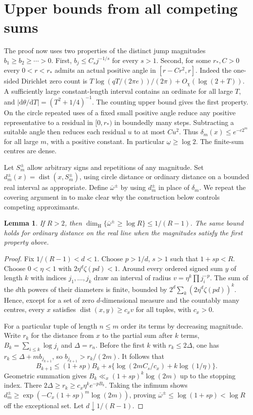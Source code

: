 \documentclass[11pt]{article}
\newtheorem{lemma}[theorem]{Lemma}
\newcommand{\HH}{\dim_{\mathrm H}}
\newcommand{\dist}{\operatorname{dist}}
\newcommand{\upexp}{\overline\omega}
\newcommand{\lowexp}{\underline\omega}
\begin{document}
\section{Upper bounds from all competing sums}
The proof now uses two properties of the distinct jump magnitudes $b_1\ge b_2\ge\cdots>0$. First, $b_j\le C_sj^{-1/s}$ for every $s>1$. Second, for some $r_*,C>0$ every $0<r<r_*$ admits an actual positive angle in $[r-Cr^2,r]$. Indeed the one-sided Dirichlet zero count is $T\log(qT/(2\pi e))/(2\pi)+O_\chi(\log(2+T))$. A sufficiently large constant-length interval contains an ordinate for all large $T$, and $|\mathrm d\theta/\mathrm dT|=(T^2+1/4)^{-1}$. The counting upper bound gives the first property. On the circle repeated uses of a fixed small positive angle reduce any positive representative to a residual in $[0,r_*)$ in boundedly many steps. Subtracting a suitable angle then reduces each residual $u$ to at most $Cu^2$. Thus $\delta_m(x)\le e^{-c2^m}$ for all large $m$, with a positive constant. In particular $\lowexp\ge\log2$. The finite-sum centres are dense.

Let $S_m^\pm$ allow arbitrary signs and repetitions of any magnitude. Set $d_m^\pm(x)=\dist(x,S_m^\pm)$, using circle distance or ordinary distance on a bounded real interval as appropriate. Define $\upexp^\pm$ by using $d_m^\pm$ in place of $\delta_m$. We repeat the covering argument in \cite{repoLi} to make clear why the construction below controls competing approximants.
\begin{lemma}\label{lem:cover}
If $R>2$, then $\HH\{\upexp^\pm\ge\log R\}\le 1/(R-1)$. The same bound holds for ordinary distance on the real line when the magnitudes satisfy the first property above.
\end{lemma}
\begin{proof}
Fix $1/(R-1)<d<1$. Choose $p>1/d$, $s>1$ such that $1+sp<R$. Choose $0<\eta<1$ with $2\eta^d\zeta(pd)<1$. Around every ordered signed sum $y$ of length $k$ with indices $j_1,\ldots,j_k$ draw an interval of radius $v=\eta^k\prod j_i^{-p}$. The sum of the $d$th powers of their diameters is finite, bounded by $2^d\sum_k(2\eta^d\zeta(pd))^k$. Hence, except for a set of zero $d$-dimensional measure and the countably many centres, every $x$ satisfies $\dist(x,y)\ge c_x v$ for all tuples, with $c_x>0$.

For a particular tuple of length $n\le m$ order its terms by decreasing magnitude. Write $r_k$ for the distance from $x$ to the partial sum after $k$ terms, $B_k=\sum_{i\le k}\log j_i$ and $\Delta=r_n$. Before the first $k$ with $r_k\le2\Delta$, one has $r_k\le\Delta+mb_{j_{k+1}}$, so $b_{j_{k+1}}>r_k/(2m)$. It follows that
\[
 B_{k+1}\le(1+sp)B_k+s\{\log(2m C_s/c_x)+k\log(1/\eta)\}.
\]
Geometric summation gives $B_k\ll_x(1+sp)^k\log(2m)$ up to the stopping index. There $2\Delta\ge r_k\ge c_x\eta^k e^{-pB_k}$. Taking the infimum shows $d_m^\pm\ge\exp(-C_x(1+sp)^m\log(2m))$, proving $\upexp^\pm\le\log(1+sp)<\log R$ off the exceptional set. Let $d\downarrow1/(R-1)$.
\end{proof}
\end{document}

